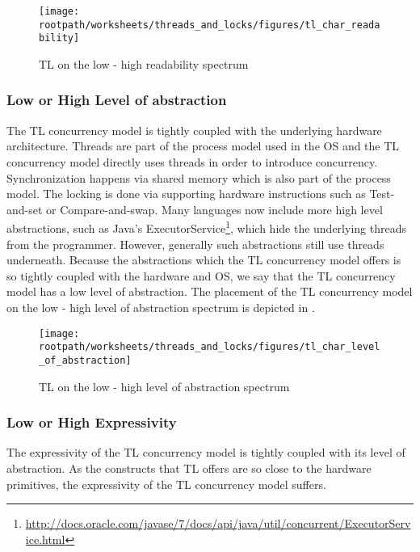 \begin{figure}[htbp]
\centering
 \texttt{[image: \\rootpath/worksheets/threads\_and\_locks/figures/tl\_char\_readability]} 
 \caption{\ac{TL} on the low - high readability spectrum}
\label{fig:char_tl_readability}
\end{figure}

\subsubsection{Low or High Level of abstraction}\label{sec:tl_level_of_abstraction}
The \ac{TL} concurrency model is tightly coupled with the underlying hardware architecture. Threads are part of the process model used in the \ac{OS} and the \ac{TL} concurrency model directly uses threads in order to introduce concurrency. Synchronization happens via shared memory which is also part of the process model. The locking is done via supporting hardware instructions such as Test-and-set or Compare-and-swap\cite[p. 1990]{scott2011sync}. Many languages now include more high level abstractions, such as Java's ExecutorService\footnote{\url{http://docs.oracle.com/javase/7/docs/api/java/util/concurrent/ExecutorService.html}}, which hide the underlying threads from the programmer. However, generally such abstractions still use threads underneath. Because the abstractions which the \ac{TL} concurrency model offers is so tightly coupled with the hardware and \ac{OS}, we say that the \ac{TL} concurrency model has a low level of abstraction. The placement of the \ac{TL} concurrency model on the low - high level of abstraction spectrum is depicted in .

\begin{figure}[htbp]
\centering
 \texttt{[image: \\rootpath/worksheets/threads\_and\_locks/figures/tl\_char\_level\_of\_abstraction]} 
 \caption{\ac{TL} on the low - high level of abstraction spectrum}
\label{fig:char_tl_level_of_abstraction}
\end{figure}

\subsubsection{Low or High Expressivity}\label{sec:tl_expressivity}
The expressivity of the \ac{TL} concurrency model is tightly coupled with its level of abstraction. As the constructs that \ac{TL} offers are so close to the hardware primitives, the expressivity of the \ac{TL} concurrency model suffers.

